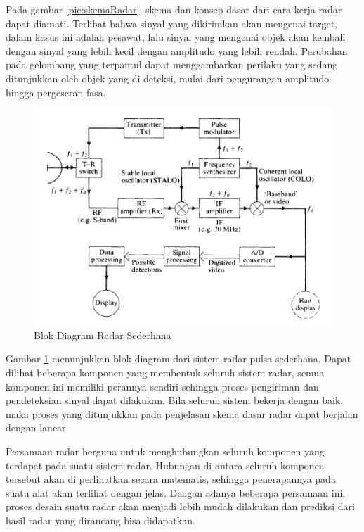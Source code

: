 Pada gambar \ref{pic:skemaRadar}, skema dan konsep dasar dari cara kerja radar dapat diamati. Terlihat bahwa sinyal yang dikirimkan akan mengenai target, dalam kasus ini adalah pesawat, lalu sinyal yang mengenai objek akan kembali dengan sinyal yang lebih kecil dengan amplitudo yang lebih rendah. Perubahan pada gelombang yang terpantul dapat menggambarkan perilaku yang sedang ditunjukkan oleh objek yang di deteksi, mulai dari pengurangan amplitudo hingga pergeseran fasa.

\begin{figure}
	\begin{center}
		\includegraphics[scale=0.4]{pics/bab2/blokdiagram.png} 
		\caption[Blok Diagram Radar]{{Blok Diagram Radar Sederhana \cite{Kingsley1999}}}
		\label{pic:blokdiagram}
	\end{center}
\end{figure}

Gambar \ref{pic:blokdiagram} menunjukkan blok diagram dari sistem radar pulsa sederhana. Dapat dilihat beberapa komponen yang membentuk seluruh sistem radar, semua komponen ini memiliki perannya sendiri sehingga proses pengiriman dan pendeteksian sinyal dapat dilakukan.  Bila seluruh sistem bekerja dengan baik, maka proses yang ditunjukkan pada penjelasan skema dasar radar dapat berjalan dengan lancar.

Persamaan radar berguna untuk menghubungkan seluruh komponen yang terdapat pada suatu sistem radar. Hubungan di antara seluruh komponen tersebut akan di perlihatkan secara matematis, sehingga penerapannya pada suatu alat akan terlihat dengan jelas. Dengan adanya beberapa persamaan ini, proses desain suatu radar akan menjadi lebih mudah dilakukan dan prediksi dari hasil radar yang dirancang bisa didapatkan.

